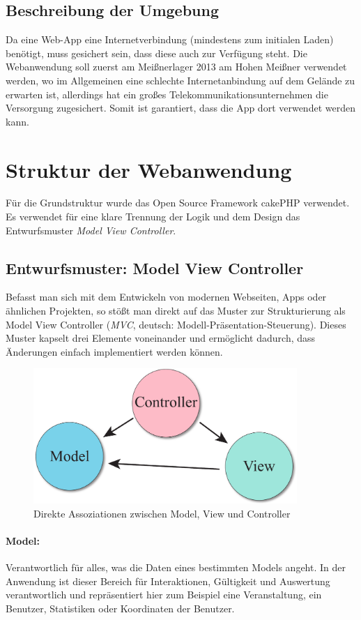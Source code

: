 \subsection{Beschreibung der Umgebung}
Da eine Web-App eine Internetverbindung (mindestens zum initialen Laden) benötigt, muss gesichert sein, dass diese auch zur Verfügung steht. Die Webanwendung soll zuerst am Meißnerlager 2013 am Hohen Meißner verwendet werden, wo im Allgemeinen eine schlechte Internetanbindung auf dem Gelände zu erwarten ist, allerdings hat ein großes Telekommunikationsunternehmen die Versorgung zugesichert. Somit ist garantiert, dass die App dort verwendet werden kann.

\section{Struktur der Webanwendung}
Für die Grundstruktur wurde das Open Source Framework cakePHP verwendet. Es verwendet für eine klare Trennung der Logik und dem Design das Entwurfsmuster \emph{Model View Controller}.

\subsection{Entwurfsmuster: Model View Controller}
Befasst man sich mit dem Entwickeln von modernen Webseiten, Apps oder ähnlichen Projekten, so stößt man direkt auf das Muster zur Strukturierung als Model View Controller (\emph{MVC}, deutsch: Modell-Präsentation-Steuerung). Dieses Muster kapselt drei Elemente voneinander und ermöglicht dadurch, dass Änderungen einfach implementiert werden können.

\begin{figure}[!ht]
	\centering
	\includegraphics[width=10cm]{fig/mvc}
	\caption{Direkte Assoziationen zwischen Model, View und Controller}
\end{figure}

\paragraph{Model:}
Verantwortlich für alles, was die Daten eines bestimmten Models angeht. In der Anwendung ist dieser Bereich für Interaktionen, Gültigkeit und Auswertung verantwortlich und repräsentiert hier zum Beispiel eine Veranstaltung, ein Benutzer, Statistiken oder Koordinaten der Benutzer.

